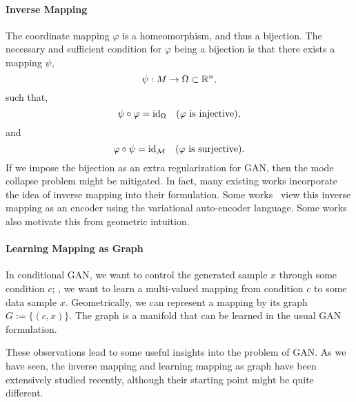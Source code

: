 \paragraph{Inverse Mapping}
The coordinate mapping $\varphi$ is a homeomorphism,
and thus a bijection.
The necessary and sufficient condition for $\varphi$ being a bijection is
that there exists a mapping $\psi$,
\begin{equation}
    \psi:M\to \Omega\subset{\mathbb{R}}^n,
\end{equation}
such that,
\begin{equation}
    \psi\circ\varphi = {\mathop{\mathrm{id}}}_\Omega \quad
    (\varphi\text{ is injective}),
\end{equation}
and
\begin{equation}
    \varphi\circ\psi = {\mathop{\mathrm{id}}}_{\mathcal{M}} \quad
    (\varphi\text{ is surjective}).
\end{equation}
If we impose the bijection as an extra regularization for GAN,
then the mode collapse problem might be mitigated.
In fact,
many existing works incorporate the idea of
inverse mapping into their formulation.
Some works~\cite{huang2016stacked,che2016mode,kim2017learning,perarnau2016invertible}
view this inverse mapping as an encoder using the
variational auto-encoder language.
Some works~\cite{zhu2016generative,zhu2017unpaired} also
motivate this from geometric intuition.

\paragraph{Learning Mapping as Graph}
In conditional GAN,
we want to control the generated sample $x$ through some condition $c$;
\ie,
we want to learn a multi-valued mapping from condition $c$ to
some data sample $x$.
Geometrically,
we can represent a mapping by its graph $G:=\{(c,x)\}$.
The graph is a manifold that can be learned in the usual GAN formulation.

These observations lead to some useful insights into the problem of GAN.
As we have seen,
the inverse mapping and learning mapping as graph have been
extensively studied recently,
although their starting point might be quite different.

